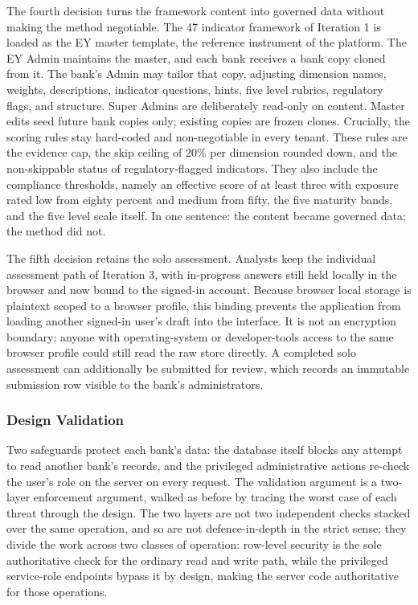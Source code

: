 The fourth decision turns the framework content into governed data without making the method negotiable. The 47 indicator framework of Iteration 1 is loaded as the EY master template, the reference instrument of the platform. The EY Admin maintains the master, and each bank receives a bank copy cloned from it. The bank's Admin may tailor that copy, adjusting dimension names, weights, descriptions, indicator questions, hints, five level rubrics, regulatory flags, and structure. Super Admins are deliberately read-only on content. Master edits seed future bank copies only; existing copies are frozen clones. Crucially, the scoring rules stay hard-coded and non-negotiable in every tenant. These rules are the evidence cap, the skip ceiling of 20\% per dimension rounded down, and the non-skippable status of regulatory-flagged indicators. They also include the compliance thresholds, namely an effective score of at least three with exposure rated low from eighty percent and medium from fifty, the five maturity bands, and the five level scale itself. In one sentence: the content became governed data; the method did not.

The fifth decision retains the solo assessment. Analysts keep the individual assessment path of Iteration 3, with in-progress answers still held locally in the browser and now bound to the signed-in account. Because browser local storage is plaintext scoped to a browser profile, this binding prevents the application from loading another signed-in user's draft into the interface. It is not an encryption boundary: anyone with operating-system or developer-tools access to the same browser profile could still read the raw store directly. A completed solo assessment can additionally be submitted for review, which records an immutable submission row visible to the bank's administrators.

\subsubsection{Design Validation}

Two safeguards protect each bank's data: the database itself blocks any attempt to read another bank's records, and the privileged administrative actions re-check the user's role on the server on every request. The validation argument is a two-layer enforcement argument, walked as before by tracing the worst case of each threat through the design. The two layers are not two independent checks stacked over the same operation, and so are not defence-in-depth in the strict sense; they divide the work across two classes of operation: row-level security is the sole authoritative check for the ordinary read and write path, while the privileged service-role endpoints bypass it by design, making the server code authoritative for those operations.

